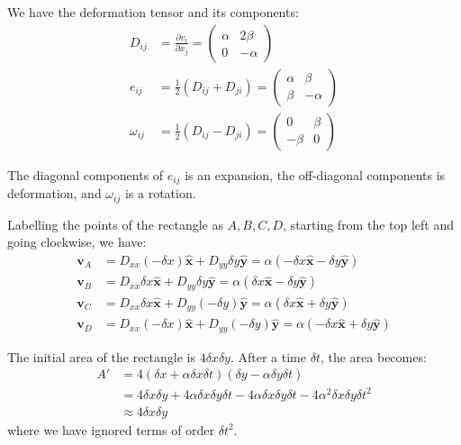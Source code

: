 \documentclass[12pt]{article}
\begin{document}
We have the deformation tensor and its components:
\begin{equation}
    \begin{split}
        D_{ij} &= \frac{\partial v_{i}}{\partial x_{j}} =
        \begin{pmatrix}
            \alpha & 2\beta  \\
            0      & -\alpha
        \end{pmatrix} \\
        e_{ij} &= \frac{1}{2} (D_{ij} + D_{ji}) =
        \begin{pmatrix}
            \alpha & \beta   \\
            \beta  & -\alpha
        \end{pmatrix} \\
        \omega_{ij} &= \frac{1}{2} (D_{ij} - D_{ji}) =
        \begin{pmatrix}
            0      & \beta \\
            -\beta & 0
        \end{pmatrix}
    \end{split}
\end{equation}

The diagonal components of $e_{ij}$ is an expansion, the off-diagonal components is deformation, and $\omega_{ij}$ is a rotation.

Labelling the points of the rectangle as $A, B, C, D$, starting from the top left and going clockwise, we have:
\begin{equation}
    \begin{split}
        \mathbf{v}_{A} &= D_{xx} (-\delta x) \hat{\mathbf{x}} + D_{yy} \delta y \hat{\mathbf{y}} = \alpha (-\delta x \hat{\mathbf{x}} - \delta y \hat{\mathbf{y}}) \\
        \mathbf{v}_{B} &= D_{xx} \delta x \hat{\mathbf{x}} + D_{yy} \delta y \hat{\mathbf{y}} = \alpha (\delta x \hat{\mathbf{x}} - \delta y \hat{\mathbf{y}}) \\
        \mathbf{v}_{C} &= D_{xx} \delta x \hat{\mathbf{x}} + D_{yy} (-\delta y) \hat{\mathbf{y}} = \alpha (\delta x \hat{\mathbf{x}} + \delta y \hat{\mathbf{y}}) \\
        \mathbf{v}_{D} &= D_{xx} (-\delta x) \hat{\mathbf{x}} + D_{yy} (-\delta y) \hat{\mathbf{y}} = \alpha (-\delta x \hat{\mathbf{x}} + \delta y \hat{\mathbf{y}})
    \end{split}
\end{equation}

The initial area of the rectangle is $4\delta x \delta y$. After a time $\delta t$, the area becomes:
\begin{equation}
    \begin{split}
        A' &= 4(\delta x + \alpha \delta x \delta t)(\delta y - \alpha \delta y \delta t) \\
        &= 4\delta x \delta y + 4\alpha \delta x \delta y \delta t - 4\alpha \delta x \delta y \delta t - 4\alpha^{2} \delta x \delta y \delta t^{2} \\
        &\approx 4\delta x \delta y
    \end{split}
\end{equation}
where we have ignored terms of order $\delta t^{2}$.
\end{document}
